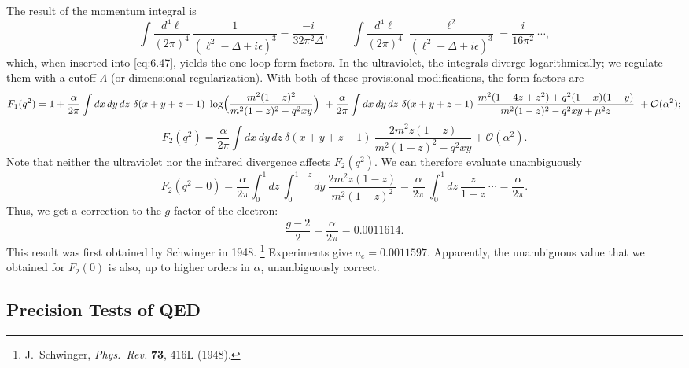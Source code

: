 The result of the momentum integral is
\begin{equation}
  \int \frac{d^4\ell}{(2\pi)^4}\ \frac{1}{(\ell^2-\Delta+i\epsilon)^3}
    = \frac{-i}{32\pi^2\Delta},
  \qquad
  \int \frac{d^4\ell}{(2\pi)^4}\ \frac{\ell^2}{(\ell^2-\Delta+i\epsilon)^3}
    = \frac{i}{16\pi^2}\ \cdots ,
  \label{eq:6.48}
\end{equation}
which, when inserted into \eqref{eq:6.47}, yields the one-loop form factors.
In the ultraviolet, the integrals diverge logarithmically; we regulate them
with a cutoff $\Lambda$ (or dimensional regularization).  With both of these
provisional modifications, the form factors are
\begin{equation}
  F_1(q^2) = 1 + \frac{\alpha}{2\pi}\int dx\,dy\,dz\
    \delta(x+y+z-1)\ \log\Bigl(
      \frac{m^2(1-z)^2}{m^2(1-z)^2 - q^2xy} \Bigr)\
    + \frac{\alpha}{2\pi}\int dx\,dy\,dz\ \delta(x+y+z-1)\
      \frac{m^2(1-4z+z^2) + q^2(1-x)(1-y)}
        {m^2(1-z)^2 - q^2xy + \mu^2 z}\
    + \mathcal{O}(\alpha^2);
  \label{eq:6.56}
\end{equation}
\begin{equation}
  F_2(q^2) = \frac{\alpha}{2\pi}\int dx\,dy\,dz\
    \delta(x+y+z-1)\ \frac{2m^2z(1-z)}{m^2(1-z)^2 - q^2xy}
    + \mathcal{O}(\alpha^2) .
  \label{eq:6.57}
\end{equation}
Note that neither the ultraviolet nor the infrared divergence affects
$F_2(q^2)$.  We can therefore evaluate unambiguously
\begin{equation}
  F_2(q^2 = 0) = \frac{\alpha}{2\pi}\int_0^1 dz\ \int_0^{1-z} dy\
    \frac{2m^2z(1-z)}{m^2(1-z)^2}
    = \frac{\alpha}{2\pi}\ \int_0^1 dz\ \frac{z}{1-z}\ \cdots
    = \frac{\alpha}{2\pi} .
  \label{eq:6.58}
\end{equation}
Thus, we get a correction to the $g$-factor of the electron:
\begin{equation}
  \frac{g-2}{2} = \frac{\alpha}{2\pi} = 0.0011614 .
  \label{eq:6.59}
\end{equation}
This result was first obtained by Schwinger in 1948.%
\footnote{J.~Schwinger, \emph{Phys.\ Rev.} \textbf{73}, 416L (1948).}
Experiments give $a_e = 0.0011597$.  Apparently, the unambiguous value that we
obtained for $F_2(0)$ is also, up to higher orders in $\alpha$, unambiguously
correct.

\subsection{Precision Tests of QED}

